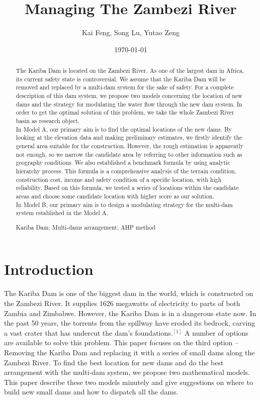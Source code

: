 \documentclass{mcmthesis}
\title{Managing The Zambezi River}
\author{Kai Feng, Song Lu, Yutao Zeng}
\date{\today}
\begin{document}
\begin{abstract}
The Kariba Dam is located on the Zambezi River. As one of the largest dam in Africa, its current safety state is controversial. We assume that the Kariba Dam will be removed and replaced by a multi-dam system for the sake of safety. For a complete description of this dam system, we propose two models concerning the location of new dams and the strategy for modulating the water flow through the new dam system. In order to get the optimal solution of this problem, we take the whole Zambezi River basin as research object.\\
\indent In Model A, our primary aim is to find the optimal locations of the new dams. By looking at the elevation data and making preliminary estimates, we firstly identify the general area suitable for the construction. However, the rough estimation is apparently not enough, so we narrow the candidate area by referring to other information such as geography conditions. We also established a benchmark formula by using analytic hierarchy process. This formula is a comprehensive analysis of the terrain condition, construction cost, income and safety condition of a specific location, with high reliability. Based on this formula, we tested a series of locations within the candidate areas and choose some candidate location with higher score as our solution.\\
\indent In Model B, our primary aim is to design a modulating strategy for the multi-dam system established in the Model A. 
\begin{keywords}
Kariba Dam; Multi-dams arrangement; AHP method
\end{keywords}
\end{abstract}
\maketitle
\section{Introduction}
\indent \indent The Kariba Dam is one of the biggest dam in the world, which is constructed on the Zambezi River. It supplies 1626 megawatts of electricity to parts of both Zambia and Zimbabwe. However, the Kariba Dam is in a dangerous state now. In the past 50 years, the torrents from the spillway have eroded its bedrock, carving a vast crater that has undercut the dam's foundations.$^{[1]}$ A number of options are available to solve this problem. This paper focuses on the third option -- Removing the Kariba Dam and replacing it with a series of small dams along the Zambezi River. To find the best location for new dams and do the best arrangement with the multi-dam system, we propose two mathematical models. This paper describe these two models minutely and give suggestions on where to build new small dams and how to dispatch all the dams. \\
\end{document}
